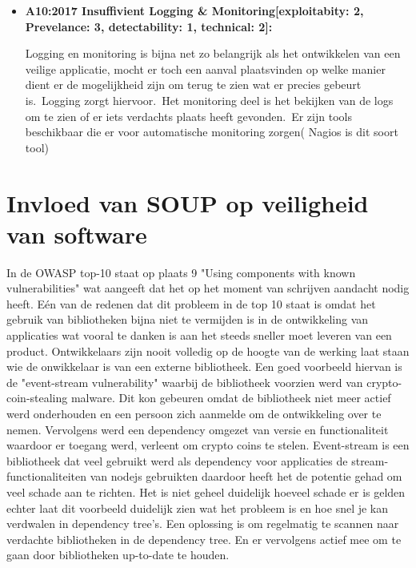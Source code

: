 \begin{itemize}
    \item \textbf{A10:2017 Insuffivient Logging \& Monitoring[exploitabity: 2, Prevelance: 3, detectability: 1, technical: 2]:}

    Logging en monitoring is bijna net zo belangrijk als het ontwikkelen van een veilige applicatie, mocht er toch een aanval plaatsvinden op welke manier dient er de mogelijkheid zijn om terug te zien wat er precies gebeurt is.\ Logging zorgt hiervoor.\ Het monitoring deel is het bekijken van de logs om te zien of er iets verdachts plaats heeft gevonden.\ Er zijn tools beschikbaar die er voor automatische monitoring zorgen( Nagios is dit soort tool)

\end{itemize}

\section{Invloed van SOUP op veiligheid van software}\label{sec:invloed-van-soup-op-veiligheid-van-software}
In de OWASP top-10 staat op plaats 9 "Using components with known vulnerabilities" wat aangeeft dat het op het moment van schrijven aandacht nodig heeft.
Eén van de redenen dat dit probleem in de top 10 staat is omdat het gebruik van bibliotheken bijna niet te vermijden is in de ontwikkeling van applicaties wat vooral te danken is aan het steeds sneller moet leveren van een product.
Ontwikkelaars zijn nooit volledig op de hoogte van de werking laat staan wie de onwikkelaar is van een externe bibliotheek.
Een goed voorbeeld hiervan is de "event-stream vulnerability" waarbij de bibliotheek voorzien werd van crypto-coin-stealing malware.
Dit kon gebeuren omdat de bibliotheek niet meer actief werd onderhouden en een persoon zich aanmelde om de ontwikkeling over te nemen.
Vervolgens werd een dependency omgezet van versie en functionaliteit waardoor er toegang werd, verleent om crypto coins te stelen.
Event-stream is een bibliotheek dat veel gebruikt werd als dependency voor applicaties de stream-functionaliteiten van nodejs gebruikten daardoor heeft het de potentie gehad om veel schade aan te richten.
Het is niet geheel duidelijk hoeveel schade er is gelden echter laat dit voorbeeld duidelijk zien wat het probleem is en hoe snel je kan verdwalen in dependency tree's.
Een oplossing is om regelmatig te scannen naar verdachte bibliotheken in de dependency tree.
En er vervolgens actief mee om te gaan door bibliotheken up-to-date te houden.

